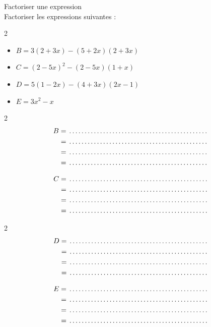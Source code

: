 \begin{Méthode}Factoriser une expression \\
Factoriser les expressions suivantes :\\
\begin{multicols}{2}
\begin{itemize}[label=\textcolor{Couleur3}{$\bullet$}]
\item $B = 3(2 + 3x) - (5 + 2x)(2 + 3x)$ 
\item $C=(2-5x)^2 -(2-5x)(1+x)$
\item $D = 5(1 - 2x) - (4 + 3x)(2x - 1)$
\item $E=3x^2 -x$
\end{itemize}
\end{multicols}

\begin{multicols}{2}
\begin{align*}
B&= \pointille{7cm} \\
&= \pointille{7cm} \\
&= \pointille{7cm} \\
&= \pointille{7cm} 
\end{align*}

\begin{align*}
C&= \pointille{7cm} \\
&= \pointille{7cm} \\
&= \pointille{7cm} \\
&= \pointille{7cm} 
\end{align*}
\end{multicols}

\begin{multicols}{2}
\begin{align*}
D&= \pointille{7cm} \\
&= \pointille{7cm} \\
&= \pointille{7cm} \\
&= \pointille{7cm} 
\end{align*}


\begin{align*}
E&= \pointille{7cm} \\
&= \pointille{7cm} \\
&= \pointille{7cm} \\
&= \pointille{7cm} 
\end{align*}
\end{multicols}


\end{Méthode}

